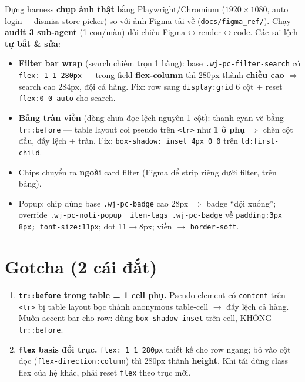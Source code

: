 Dựng harness \textbf{chụp ảnh thật} bằng Playwright/Chromium ($1920\times1080$, auto login + dismiss
store-picker) so với ảnh Figma tải về (\texttt{docs/figma\_ref/}). Chạy \textbf{audit 3 sub-agent}
(1 con/màn) đối chiếu Figma$\leftrightarrow$render$\leftrightarrow$code. Các sai lệch \textbf{tự bắt \&
sửa}:

\begin{itemize}
  \item \textbf{Filter bar wrap} (search chiếm trọn 1 hàng): base \texttt{.wj-pc-filter-search} có
        \texttt{flex: 1 1 280px} --- trong field \textbf{flex-column} thì 280px thành \textbf{chiều cao}
        $\Rightarrow$ search cao 284px, đội cả hàng. Fix: row sang \texttt{display:grid} 6 cột +
        reset \texttt{flex:0 0 auto} cho search.
  \item \textbf{Bảng tràn viền} (dòng chưa đọc lệch nguyên 1 cột): thanh cyan vẽ bằng
        \texttt{tr::before} --- table layout coi pseudo trên \texttt{<tr>} như \textbf{1 ô phụ}
        $\Rightarrow$ chèn cột đầu, đẩy lệch + tràn. Fix: \texttt{box-shadow: inset 4px 0 0} trên
        \texttt{td:first-child}.
  \item Chips chuyển ra \textbf{ngoài} card filter (Figma để strip riêng dưới filter, trên bảng).
  \item Popup: chip dùng base \texttt{.wj-pc-badge} cao 28px $\Rightarrow$ badge ``đội xuống'';
        override \texttt{.wj-pc-noti-popup\_\_item-tags .wj-pc-badge} về \texttt{padding:3px 8px;
        font-size:11px}; dot $11\rightarrow8$px; viền $\rightarrow$ \texttt{border-soft}.
\end{itemize}

\section{Gotcha (2 cái đắt)}

\begin{enumerate}
  \item \textbf{\texttt{tr::before} trong table = 1 cell phụ.} Pseudo-element có \texttt{content} trên
        \texttt{<tr>} bị table layout bọc thành anonymous table-cell $\rightarrow$ đẩy lệch cả hàng.
        Muốn accent bar cho row: dùng \texttt{box-shadow inset} trên cell, KHÔNG \texttt{tr::before}.
  \item \textbf{\texttt{flex} basis đổi trục.} \texttt{flex: 1 1 280px} thiết kế cho row ngang; bỏ vào
        cột dọc (\texttt{flex-direction:column}) thì 280px thành \textbf{height}. Khi tái dùng class
        flex của hệ khác, phải reset \texttt{flex} theo trục mới.
\end{enumerate}

